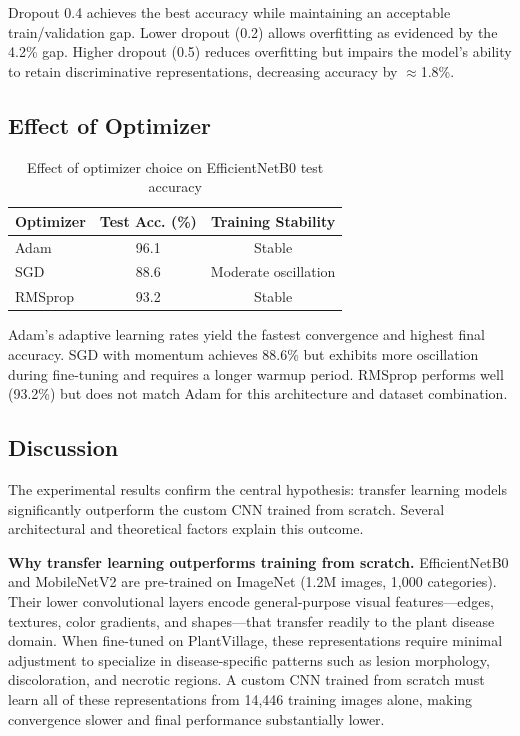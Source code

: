 \documentclass[10pt,twocolumn]{article}
\begin{document}
Dropout 0.4 achieves the best accuracy while maintaining an acceptable train/validation gap. Lower dropout (0.2) allows overfitting as evidenced by the 4.2\% gap. Higher dropout (0.5) reduces overfitting but impairs the model's ability to retain discriminative representations, decreasing accuracy by $\approx$1.8\%.

\subsection{Effect of Optimizer}

\begin{table}[H]
\centering
\caption{Effect of optimizer choice on EfficientNetB0 test accuracy}
\label{tab:optimizer}
\begin{tabular}{lcc}
\toprule
\textbf{Optimizer} & \textbf{Test Acc. (\%)} & \textbf{Training Stability} \\
\midrule
Adam    & 96.1 & Stable \\
SGD     & 88.6 & Moderate oscillation \\
RMSprop & 93.2 & Stable \\
\bottomrule
\end{tabular}
\end{table}

Adam's adaptive learning rates yield the fastest convergence and highest final accuracy. SGD with momentum achieves 88.6\% but exhibits more oscillation during fine-tuning and requires a longer warmup period. RMSprop performs well (93.2\%) but does not match Adam for this architecture and dataset combination.

\subsection{Discussion}

The experimental results confirm the central hypothesis: transfer learning models significantly outperform the custom CNN trained from scratch. Several architectural and theoretical factors explain this outcome.

\textbf{Why transfer learning outperforms training from scratch.} EfficientNetB0 and MobileNetV2 are pre-trained on ImageNet (1.2M images, 1,000 categories). Their lower convolutional layers encode general-purpose visual features—edges, textures, color gradients, and shapes—that transfer readily to the plant disease domain. When fine-tuned on PlantVillage, these representations require minimal adjustment to specialize in disease-specific patterns such as lesion morphology, discoloration, and necrotic regions. A custom CNN trained from scratch must learn all of these representations from 14,446 training images alone, making convergence slower and final performance substantially lower.
\end{document}

